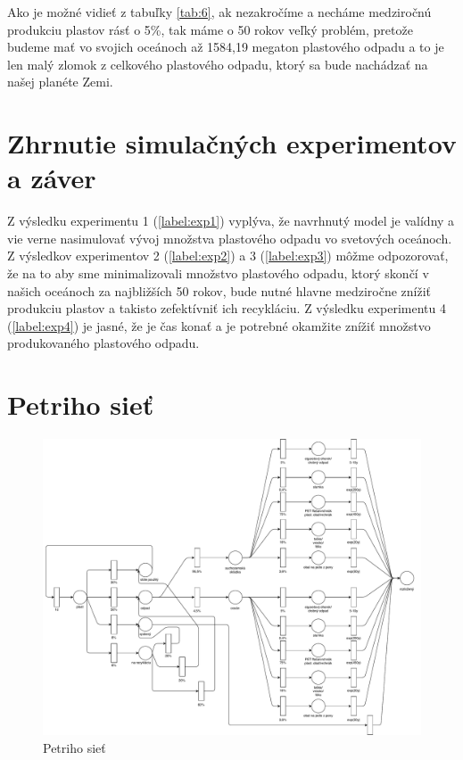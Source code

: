 \documentclass[a4paper, 11pt]{article}
\begin{document}
Ako je možné vidieť z tabuľky \ref{tab:6}, ak nezakročíme a necháme medziročnú produkciu plastov rásť o 5\%, tak máme o 50 rokov veľký problém, pretože budeme mať vo svojich oceánoch až 1584,19 megaton plastového odpadu a to je len malý zlomok z celkového plastového odpadu, ktorý sa bude nachádzať na našej planéte Zemi.

\pagebreak
\section{Zhrnutie simulačných experimentov a záver}

Z výsledku experimentu 1 (\ref{label:exp1}) vyplýva, že navrhnutý model je valídny a vie verne nasimulovať vývoj množstva plastového odpadu vo svetových oceánoch. Z výsledkov experimentov 2 (\ref{label:exp2}) a 3 (\ref{label:exp3}) môžme odpozorovať, že na to aby sme minimalizovali množstvo plastového odpadu, ktorý skončí v našich oceánoch za najbližších 50 rokov, bude nutné hlavne medziročne znížiť produkciu plastov a takisto zefektívniť ich recykláciu. Z výsledku experimentu 4 (\ref{label:exp4}) je jasné, že je čas konať a je potrebné okamžite znížiť množstvo produkovaného plastového odpadu.

\clearpage

\renewcommand{\refname}{Literatúra}


\clearpage
\appendix

\section{Petriho sieť}
\label{appendix:petri_net}

\begin{figure}[ht]
	\centering
	\includegraphics[width=1 \linewidth]{IMSpetri.pdf}
	\caption{Petriho sieť}
\end{figure}
\end{document}
